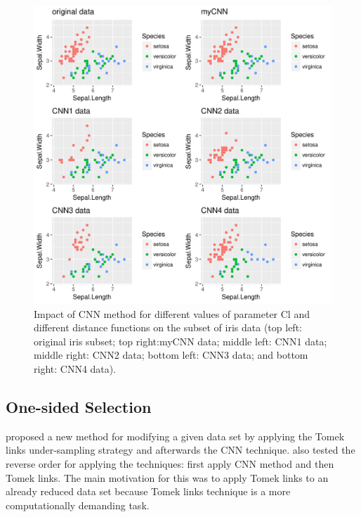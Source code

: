 \documentclass[10pt,a4paper]{article}\usepackage[]{graphicx}\usepackage[]{color}
\makeatletter
\def\maxwidth{ %
  \ifdim\Gin@nat@width>\linewidth
    \linewidth
  \else
    \Gin@nat@width
  \fi
}
\newenvironment{knitrout}{}{} %
\makeatother
\begin{document}
\begin{knitrout}\footnotesize
{}\color{fgcolor}\begin{figure}

{\centering \includegraphics[width=\maxwidth]{figures/UBL-CNN_plot-1} 

}

\caption[Impact of CNN method for different values of parameter Cl and different distance functions on the subset of iris data (top left]{Impact of CNN method for different values of parameter Cl and different distance functions on the subset of iris data (top left: original iris subset; top right:myCNN data; middle left: CNN1 data; middle right: CNN2 data; bottom left: CNN3 data; and bottom right: CNN4 data).}\label{fig:CNN_plot}
\end{figure}


\end{knitrout}


\subsection{One-sided Selection}\label{sec:OSS}


\cite{KM97} proposed a new method for modifying a given data set by applying the Tomek links under-sampling strategy and afterwards the CNN technique. \cite{batista2004study} also tested the reverse order for applying the techniques: first apply CNN method and then Tomek links. The main motivation for this was to apply Tomek links to an already reduced data set because Tomek links technique is a more computationally demanding task.
\end{document}
